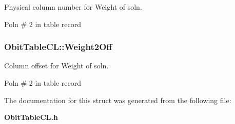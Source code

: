 Physical column number for Weight of soln. 

Poln \# 2 in table record 
\subsubsection{ {\bf Obit\-Table\-CL::Weight2Off}}\label{structObitTableCL_o83}


Column offset for Weight of soln. 

Poln \# 2 in table record 

The documentation for this struct was generated from the following file:\begin{CompactItemize}
\item 
{\bf Obit\-Table\-CL.h}\end{CompactItemize}
